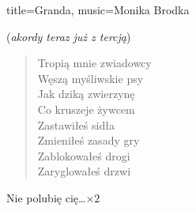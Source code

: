 \begin{song}{title={Granda}, music={Monika Brodka}}
    \begin{info}
        (\textit{akordy teraz już z tercją})
    \end{info}
    \begin{verse}
        Tropią mnie zwiadowcy \\
        Węszą myśliwskie psy \\
        Jak dziką zwierzynę \\
        Co kruszeje żywcem \\
        Zastawiłeś sidła \\
        Zmieniłeś zasady gry \\ 
        Zablokowałeś drogi \\
        Zaryglowałeś drzwi
    \end{verse}
    \begin{chorus}
        Nie polubię cię\ldots $\times 2$
    \end{chorus}
\end{song}

